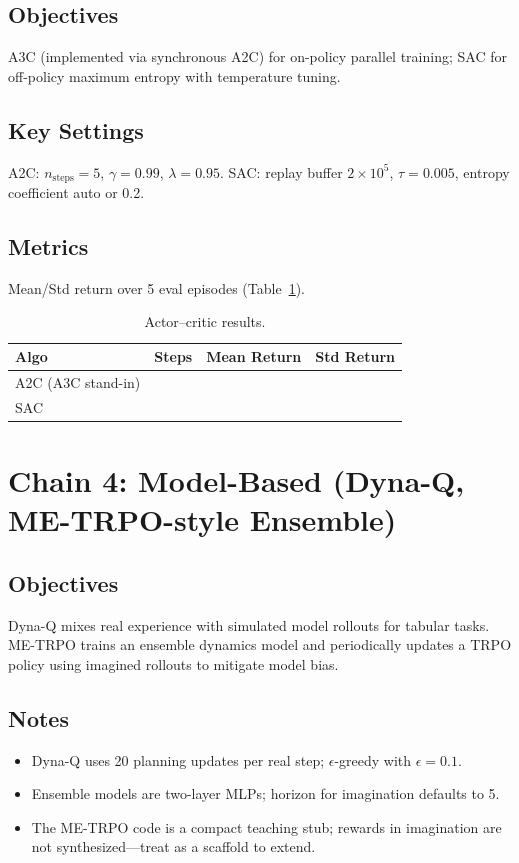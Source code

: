 \documentclass[11pt]{article}
\begin{document}
\subsection{Objectives}
A3C (implemented via synchronous A2C) for on-policy parallel training; SAC for off-policy maximum entropy with temperature tuning.

\subsection{Key Settings}
A2C: $n_{\text{steps}}=5$, $\gamma=0.99$, $\lambda=0.95$. SAC: replay buffer $2\times10^5$, $\tau=0.005$, entropy coefficient auto or 0.2.

\subsection{Metrics}
Mean/Std return over 5 eval episodes (Table~\ref{tab:acresults}).

\begin{table}[h]
\centering
\caption{Actor--critic results.}
\label{tab:acresults}
\begin{tabular}{lccc}
\toprule
Algo & Steps & Mean Return & Std Return \\
\midrule
A2C (A3C stand-in) & & & \\
SAC & & & \\
\bottomrule
\end{tabular}
\end{table}

\section{Chain 4: Model-Based (Dyna-Q, ME-TRPO-style Ensemble)}
\subsection{Objectives}
Dyna-Q mixes real experience with simulated model rollouts for tabular tasks. ME-TRPO trains an ensemble dynamics model and periodically updates a TRPO policy using imagined rollouts to mitigate model bias.

\subsection{Notes}
\begin{itemize}[leftmargin=*]
    \item Dyna-Q uses 20 planning updates per real step; $\epsilon$-greedy with $\epsilon=0.1$.
    \item Ensemble models are two-layer MLPs; horizon for imagination defaults to 5.
    \item The ME-TRPO code is a compact teaching stub; rewards in imagination are not synthesized—treat as a scaffold to extend.
\end{itemize}
\end{document}
